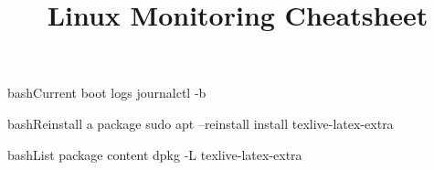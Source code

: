 \documentclass[10pt,a4paper]{article}
\title{\color{w3schools}Linux Monitoring Cheatsheet
}
\begin{document}
\maketitle
\small
\begin{multicols}{3}

\thispagestyle{empty}
\scriptsize

% 




\begin{codebox}{bash}{Current boot logs}
journalctl -b

\end{codebox}

\begin{codebox}{bash}{Reinstall a package}
sudo apt --reinstall install texlive-latex-extra

\end{codebox}

\begin{codebox}{bash}{List package content}
dpkg -L texlive-latex-extra

\end{codebox}


\AtNextBibliography{\footnotesize}
\printbibliography  
\end{multicols}
\end{document}
